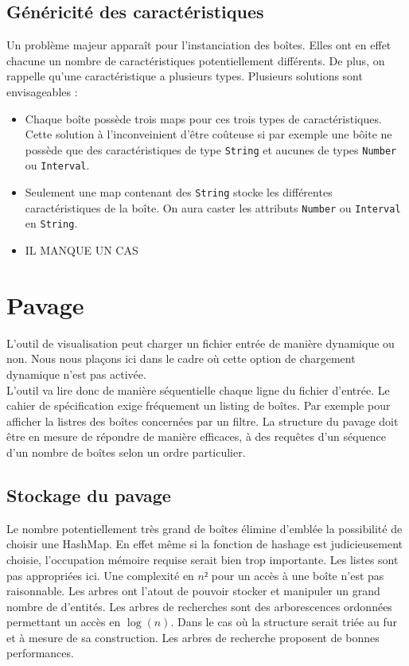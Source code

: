 \subsection{Généricité des caractéristiques}
Un problème majeur apparaît pour l'instanciation des boîtes. Elles ont en effet chacune un nombre de caractéristiques potentiellement différents. De plus, on rappelle qu'une caractéristique a plusieurs types. Plusieurs solutions sont envisageables : 
\begin{itemize}
 \item 
Chaque boîte possède trois maps pour ces trois types de caractéristiques. Cette solution à l'inconveinient d'être coûteuse si par exemple une bôite ne possède que des caractéristiques de type \verb+String+ et aucunes de types \verb+Number+ ou \verb+Interval+. 
 \item
Seulement une map contenant des \verb+String+ stocke les différentes caractéristiques de la boîte. On aura caster les attributs \verb+Number+ ou \verb+Interval+ en \verb+String+.
\item \huge{IL MANQUE UN CAS}
\end{itemize}


\section{Pavage}
L'outil de visualisation peut charger un fichier entrée de manière dynamique ou non. Nous nous plaçons ici dans le cadre où cette option de chargement dynamique n'est pas activée. \\ L'outil va lire donc de manière  séquentielle chaque ligne du fichier d'entrée. Le cahier de spécification exige fréquement un listing de boîtes. Par exemple pour afficher la listres des boîtes concernées par un filtre. La structure du pavage doit être en mesure de répondre de manière efficaces, à des requêtes d'un séquence d'un nombre de  boîtes selon un ordre particulier. 

\subsection{Stockage du pavage}
Le nombre potentiellement très grand de boîtes élimine d'emblée la possibilité de choisir une HashMap. En effet même si la fonction de hashage est judicieusement choisie, l'occupation mémoire requise serait bien trop importante. Les listes sont pas appropriées ici. Une complexité en $n²$ pour un accès à une boîte n'est pas raisonnable. Les arbres ont l'atout de pouvoir stocker et manipuler un grand nombre de d'entités. Les arbres de recherches sont des arborescences ordonnées permettant un accès en $\log(n)$. Dans le cas où la structure serait triée au fur et à mesure de sa construction. Les arbres de recherche proposent de bonnes performances.



